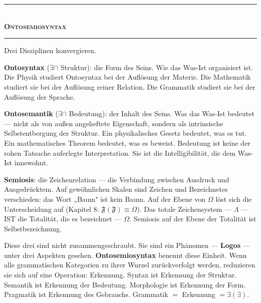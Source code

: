 \documentclass[10pt, openany, oneside]{book}
\renewcommand{\normalsize}{\fontsize{10}{13}\selectfont}
\begin{document}
\vspace{1.5em}


\begin{center}
    \rule{0.3\textwidth}{0.4pt}\\[0.5em]
    {\normalsize\bfseries\scshape Ontosemiosyntax}\\[0.3em]
    \rule{0.3\textwidth}{0.4pt}
\end{center}

\vspace{1em}

\noindent Drei Disziplinen konvergieren.

\textbf{Ontosyntax} ($\exists \cap$ Struktur): die Form des Seins. Wie das Was-Ist organisiert ist. Die Physik studiert Ontosyntax bei der Auflösung der Materie. Die Mathematik studiert sie bei der Auflösung reiner Relation. Die Grammatik studiert sie bei der Auflösung der Sprache.

\textbf{Ontosemantik} ($\exists \cap$ Bedeutung): der Inhalt des Seins. Was das Was-Ist bedeutet --- nicht als von außen angeheftete Eigenschaft, sondern als intrinsische Selbstentbergung der Struktur. Ein physikalisches Gesetz bedeutet, was es tut. Ein mathematisches Theorem bedeutet, was es beweist. Bedeutung ist keine der rohen Tatsache auferlegte Interpretation. Sie ist die Intelligibilität, die dem Was-Ist innewohnt.

\textbf{Semiosis}: die Zeichenrelation --- die Verbindung zwischen Ausdruck und Ausgedrücktem. Auf gewöhnlichen Skalen sind Zeichen und Bezeichnetes verschieden: das Wort „Baum" ist kein Baum. Auf der Ebene von $\Omega$ löst sich die Unterscheidung auf (Kapitel 8: $\mathfrak{F}(\mathfrak{F}) \equiv \Omega$). Das totale Zeichensystem --- $\Lambda$ --- IST die Totalität, die es bezeichnet --- $\Omega$. Semiosis auf der Ebene der Totalität ist Selbstbezeichnung.

Diese drei sind nicht zusammengeschraubt. Sie sind ein Phänomen --- \textbf{Logos} --- unter drei Aspekten gesehen. \textbf{Ontosemiosyntax} benennt diese Einheit. Wenn alle grammatischen Kategorien zu ihrer Wurzel zurückverfolgt werden, reduzieren sie sich auf eine Operation: Erkennung. Syntax ist Erkennung der Struktur. Semantik ist Erkennung der Bedeutung. Morphologie ist Erkennung der Form. Pragmatik ist Erkennung des Gebrauchs. Grammatik $=$ Erkennung $= \exists(\exists)$.
\end{document}
